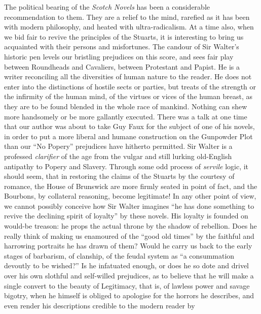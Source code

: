 The political bearing of the \emph{Scotch Novels} has been a
considerable recommendation to them. They are a relief to the
mind, rarefied as it has been with modern philosophy, and heated
with ultra-radicalism. At a time also, when we bid fair to revive
the principles of the Stuarts, it is interesting to bring us
acquainted with their persons and misfortunes. The candour of Sir
Walter's historic pen levels our bristling prejudices on this
score, and sees fair play between Roundheads and Cavaliers,
between Protestant and Papist. He is a writer reconciling all the
diversities of human nature to the reader. He does not enter into
the distinctions of hostile sects or parties, but treats of the
strength or the infirmity of the human mind, of the virtues or
vices of the human breast, as they are to be found blended in the
whole race of mankind. Nothing can shew more handsomely or be more
gallantly executed. There was a talk at one time that our author
was about to take Guy Faux for the subject of one of his novels,
in order to put a more liberal and humane construction on the
Gunpowder Plot than our ``No Popery'' prejudices have hitherto
permitted. Sir Walter is a professed \emph{clarifier} of the age from
the vulgar and still lurking old-English antipathy to Popery and
Slavery. Through some odd process of \emph{servile} logic, it should
seem, that in restoring the claims of the Stuarts by the courtesy
of romance, the House of Brunswick are more firmly seated in point
of fact, and the Bourbons, by collateral reasoning, become
legitimate! In any other point of view, we cannot possibly
conceive how Sir Walter imagines ``he has done something to revive
the declining spirit of loyalty'' by these novels. His loyalty is
founded on would-be treason: he props the actual throne by the
shadow of rebellion. Does he really think of making us enamoured
of the ``good old times'' by the faithful and harrowing portraits he
has drawn of them? Would he carry us back to the early stages of
barbarism, of clanship, of the feudal system as ``a consummation
devoutly to be wished?'' Is he infatuated enough, or does he so
dote and drivel over his own slothful and self-willed prejudices,
as to believe that he will make a single convert to the beauty of
Legitimacy, that is, of lawless power and savage bigotry, when he
himself is obliged to apologise for the horrors he describes, and
even render his descriptions credible to the modern reader by
